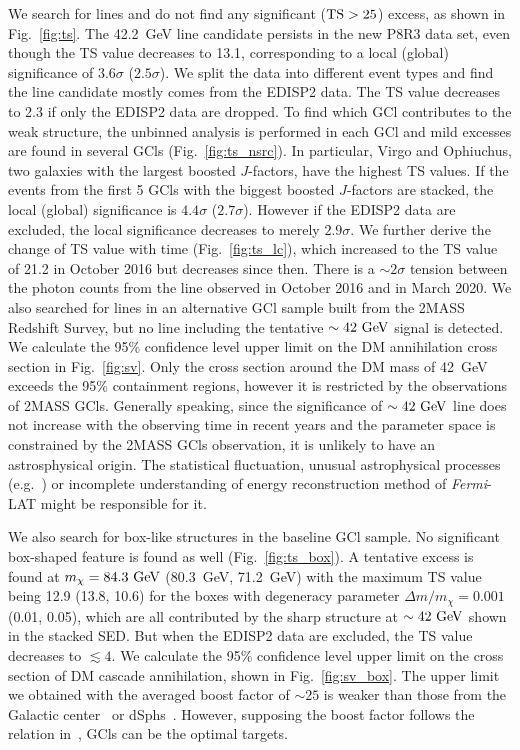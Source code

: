 \documentclass[
	twocolumn,
]{aastex6} %
\newcommand{\lat}{\emph{Fermi}-LAT\xspace}
\begin{document}
We search for lines and do not find any significant ($\rm TS>25$) excess, as shown in Fig.~\ref{fig:ts}.
The 42.2~GeV line candidate persists in the new P8R3 data set, even though the TS value decreases to 13.1, corresponding to a local (global) significance of $3.6\sigma$ ($2.5\sigma$).
We split the data into different event types and find the line candidate mostly comes from the EDISP2 data.
The TS value decreases to 2.3 if only the EDISP2 data are dropped.
To find which GCl contributes to the weak structure, the unbinned analysis is performed in each GCl and mild excesses are found in several GCls (Fig.~\ref{fig:ts_nsrc}).
In particular, Virgo and Ophiuchus, two galaxies with the largest boosted $J$-factors, have the highest TS values.
If the events from the first 5 GCls with the biggest boosted $J$-factors are stacked, the local (global) significance is $4.4\sigma$ ($2.7\sigma$).
However if the EDISP2 data are excluded, the local significance decreases to merely $2.9\sigma$.
We further derive the change of TS value with time (Fig.~\ref{fig:ts_lc}), which increased to the TS value of 21.2 in October 2016 but decreases since then.
There is a $\sim 2\sigma$ tension between the photon counts from the line observed in October 2016 and in March 2020.
We also searched for lines in an alternative GCl sample built from the 2MASS Redshift Survey, but no line including the tentative $\sim 42~\rm GeV$ signal is detected.
We calculate the 95\% confidence level upper limit on the DM annihilation cross section in Fig.~\ref{fig:sv}.
Only the cross section around the DM mass of 42~GeV exceeds the 95\% containment regions, however it is restricted by the observations of 2MASS GCls.
Generally speaking, since the significance of $\sim 42~\rm GeV$ line does not increase with the observing time in recent years and the parameter space is constrained by the 2MASS GCls observation, it is unlikely to have an astrosphysical origin.
The statistical fluctuation, unusual astrophysical processes (e.g.~\citet{Aharonian2012}) or incomplete understanding of energy reconstruction method of \lat might be responsible for it.

We also search for box-like structures in the baseline GCl sample.
No significant box-shaped feature is found as well (Fig.~\ref{fig:ts_box}).
A tentative excess is found at $m_\chi=84.3~\rm GeV$ (80.3~GeV, 71.2~GeV) with the maximum TS value being 12.9 (13.8, 10.6) for the boxes with degeneracy parameter $\Delta m/m_\chi=0.001$ (0.01, 0.05), which are all contributed by the sharp structure at $\sim 42~\rm GeV$ shown in the stacked SED.
But when the EDISP2 data are excluded, the TS value decreases to $\lesssim 4$.
We calculate the 95\% confidence level upper limit on the cross section of DM cascade annihilation, shown in Fig.~\ref{fig:sv_box}.
The upper limit we obtained with the averaged boost factor of $\sim 25$ is weaker than those from the Galactic center~\citep{Ibarra2012,Ibarra2013} or dSphs~\citep{LiS2018}.
However, supposing the boost factor follows the relation in~\citet{Gao2012}, GCls can be the optimal targets.
\end{document}

